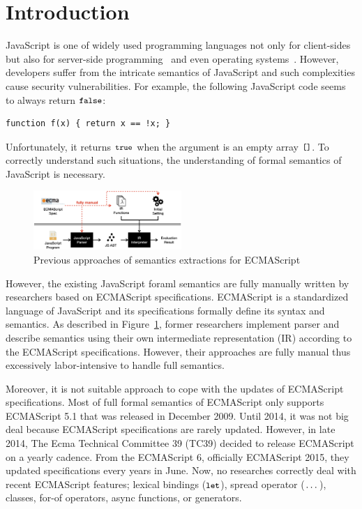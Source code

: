 \section{Introduction}

JavaScript is one of widely used programming languages not only for client-sides
but also for server-side programming~\cite{???} and even operating systems~\cite{???}.
However, developers suffer from the intricate semantics of JavaScript and
such complexities cause security vulnerabilities. For example, the following JavaScript
code seems to always return \( \texttt{\small false} \):
\begin{lstlisting}[style=myJSstyle]
function f(x) { return x == !x; }
\end{lstlisting}
Unfortunately, it returns \( \texttt{\small true} \) when the argument is an empty array
\( \texttt{\small[]} \). To correctly understand such situations, the understanding of
formal semantics of JavaScript is necessary.

\begin{figure}
  \centering
  \includegraphics[width=0.5\textwidth]{img/previous.png}
  \caption{Previous approaches of semantics extractions for ECMAScript}
  \label{fig:previous}
\end{figure}

However, the existing JavaScript foraml semantics are fully manually written
by researchers based on ECMAScript specifications. ECMAScript is a standardized language
of JavaScript and its specifications formally define its syntax and semantics.
As described in Figure~\ref{fig:previous}, former researchers implement parser and
describe semantics using their own intermediate representation (IR) according to the ECMAScript
specifications. However, their approaches are fully manual thus excessively labor-intensive
to handle full semantics.

Moreover, it is not suitable approach to cope with the updates of ECMAScript specifications.
Most of full formal semantics of ECMAScript only supports ECMAScript 5.1 that was
released in December 2009. Until 2014, it was not big deal because ECMAScript
specifications are rarely updated. However, in late 2014, The Ecma Technical
Committee 39 (TC39) decided to release ECMAScript on a yearly cadence. From the
ECMAScript 6, officially ECMAScript 2015, they updated specifications every years
in June. Now, no researches correctly deal with recent ECMAScript features;
lexical bindings (\( \texttt{\small let} \)), spread operator (\( \texttt{\small...} \)),
classes, for-of operators, async functions, or generators.

